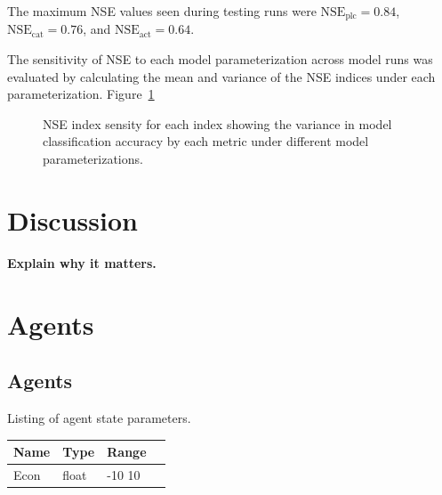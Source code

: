 The maximum NSE values seen during testing runs were 
$\text{NSE}_\text{plc}=0.84$,
$\text{NSE}_\text{cat}=0.76$, and
$\text{NSE}_\text{act}=0.64$.

The sensitivity of NSE to each model parameterization across model
runs was evaluated by calculating the mean and variance of the NSE indices
under each parameterization. Figure~\ref{fig:land_nse}

\begin{figure}
    \centering
    \hfill
    \hfill
    \caption{NSE index sensity for each index showing the variance in
    model classification accuracy by each metric under different model
    parameterizations.}
    \label{fig:land_nse}
\end{figure}

\section{Discussion}
\label{sec:land_disc}

\textbf{Explain why it matters.}

\section{Agents}
\subsection{Agents}

Listing of agent state parameters.

\begin{table}
\begin{tabular}{llll}
\hline
\hline
    Name & Type & Range \\
    \hline
    Econ & float & -10 10 \\
\end{tabular}
\end{table}

